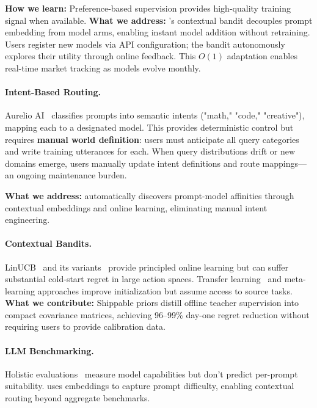 \textbf{How we learn:} Preference-based supervision provides high-quality training signal when available. \textbf{What we address:} \ours{}'s contextual bandit decouples prompt embedding from model arms, enabling instant model addition without retraining. Users register new models via API configuration; the bandit autonomously explores their utility through online feedback. This $O(1)$ adaptation enables real-time market tracking as models evolve monthly.

\paragraph{Intent-Based Routing.}
Aurelio AI~\cite{aureliolabs2024semantic} classifies prompts into semantic intents ("math," "code," "creative"), mapping each to a designated model. This provides deterministic control but requires \textbf{manual world definition}: users must anticipate all query categories and write training utterances for each. When query distributions drift or new domains emerge, users manually update intent definitions and route mappings---an ongoing maintenance burden.

\textbf{What we address:} \ours{} automatically discovers prompt-model affinities through contextual embeddings and online learning, eliminating manual intent engineering.

\paragraph{Contextual Bandits.}
LinUCB~\cite{li2010contextual} and its variants~\cite{abbasi2011improved} provide principled online learning but can suffer substantial cold-start regret in large action spaces. Transfer learning~\cite{taylor2009transfer} and meta-learning approaches improve initialization but assume access to source tasks. \textbf{What we contribute:} Shippable priors distill offline teacher supervision into compact covariance matrices, achieving 96--99\% day-one regret reduction without requiring users to provide calibration data.

\paragraph{LLM Benchmarking.}
Holistic evaluations~\cite{liang2022holistic,srivastava2022beyond} measure model capabilities but don't predict per-prompt suitability. \ours{} uses embeddings to capture prompt difficulty, enabling contextual routing beyond aggregate benchmarks.


